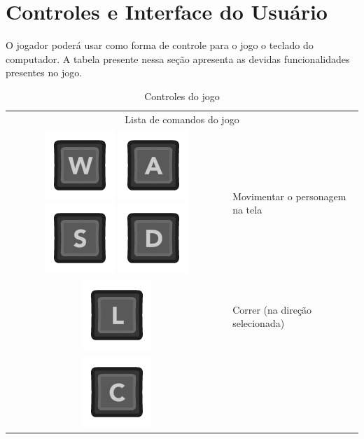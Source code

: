 \documentclass[12pt]{article}
\begin{document}
\section{Controles e Interface do Usuário}
O jogador poderá usar como forma de controle para o jogo o teclado do computador. A tabela presente nessa seção apresenta as devidas funcionalidades presentes no jogo.

\begin{longtable}{|c|p{10cm}|}
\caption{Controles do jogo}
\onehalfspacing
\\
\hline
\multicolumn{2}{|c|}{Lista de comandos do jogo}
\\
\hline
\includegraphics[scale=0.3]{images/kW.png} 
\includegraphics[scale=0.3]{images/kA.png}
\includegraphics[scale=0.3]{images/kS.png}
\includegraphics[scale=0.3]{images/kD.png}
& Movimentar o personagem na tela
\\
\hline
\includegraphics[scale=0.3]{images/kL.png}
 & Correr (na direção selecionada)
\\
\hline
\includegraphics[scale=0.3]{images/kC.png}

\end{longtable}
\end{document}

